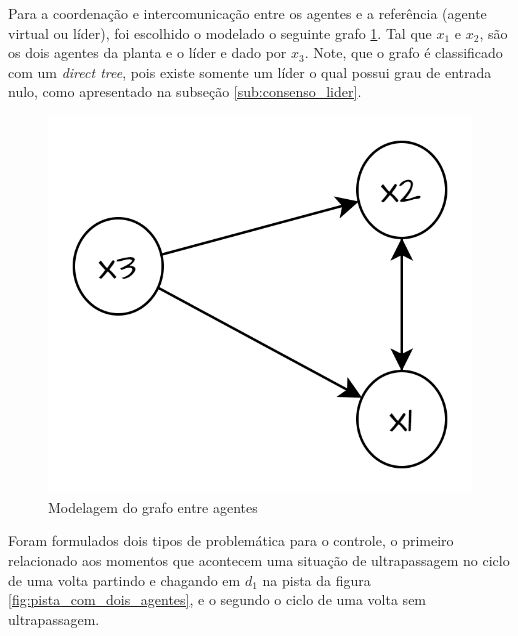 Para a coordenação e intercomunicação entre os agentes e a referência (agente virtual ou líder), foi escolhido o modelado o seguinte grafo \ref{fig:grafo_cooperativo}. Tal que $x_1$ e $x_2$, são os dois agentes da planta e o líder e dado por $x_3$. Note, que o grafo é classificado com um \textit{direct tree}, pois existe somente um líder o qual possui grau de entrada nulo, como apresentado na subseção \ref{sub:consenso_lider}. 

\begin{figure}[ht]
    \centering
    \caption{Modelagem do grafo entre agentes}
    \label{fig:grafo_cooperativo}
    \includegraphics[width=0.4\linewidth]{figures/Simulation/Cooperativo/grafo_cooperativo.png}
\end{figure}

Foram formulados dois tipos de problemática para o controle, o primeiro relacionado aos momentos que acontecem uma situação de ultrapassagem no ciclo de uma volta partindo e chagando em $d_1$ na pista da figura \ref{fig:pista_com_dois_agentes}, e o segundo o ciclo de uma volta sem ultrapassagem.


